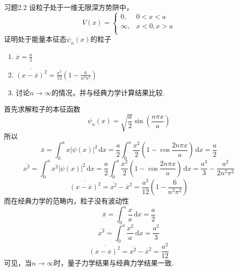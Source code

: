 \begin{question}{习题2.2}
    设粒子处于一维无限深方势阱中，
    $$
        V(x) = \begin{cases}
            0,      & 0<x<a    \\
            \infty, & x<0, x>a \\
        \end{cases}
    $$
    证明处于能量本征态$\psi_n(x)$的粒子
    \begin{enumerate}
        \item $\displaystyle \overline{x}=\frac{a}{2}$
        \item $\displaystyle \overline{\left(x-\overline{x}\right)^2} = \frac{a^2}{12}\left(1-\frac{6}{n^2\pi^2}\right)$
        \item 讨论$n\to\infty$的情况，并与经典力学计算结果比较.
    \end{enumerate}
\end{question}
\begin{solution}
    首先求解粒子的本征函数
    $$
        \psi_n(x) = \sqrt{\frac{a}{2}}\sin\left(\frac{n\pi x}{a}\right)
    $$
    所以
    $$
        \overline{x} = \int_{0}^{a}x|\psi(x)|^2\,\mathrm{d}x
        = \frac{a}{2}\int_0^a\frac{x^2}{2}\left(1-\cos\frac{2n\pi x}{a}\right)\,\mathrm{d}x
        = \frac{a}{2}
    $$
    $$
        \overline{x^2}
        = \int_{0}^{a}x^2|\psi(x)|^2\,\mathrm{d}x
        = \frac{a}{2}\int_0^a\frac{x^2}{2}\left(1-\cos\frac{2n\pi x}{a}\right)\,\mathrm{d}x
        = \frac{a^3}{3} - \frac{a^2}{2n^2\pi^2}
    $$
    $$
        \overline{\left(x-\overline{x}\right)^2}
        = \overline{x^2} - \overline{x}^2
        = \frac{a^2}{12}\left(1-\frac{6}{n^2\pi^2}\right)
    $$
    而在经典力学的范畴内，粒子没有波动性
    $$
        \overline{x}
        = \int_{0}^{a}\frac{x}{a}\,\mathrm{d}x
        = \frac{a}{2}
    $$
    $$
        \overline{x^2}
        = \int_{0}^{a}\frac{x^2}{a}\,\mathrm{d}x
        = \frac{a^2}{3}
    $$
    $$
        \overline{\left(x-\overline{x}\right)^2}
        = \overline{x^2} - \overline{x}^2
        = \frac{a^2}{12}
    $$
    可见，当$n\to\infty$时，量子力学结果与经典力学结果一致.
\end{solution}

